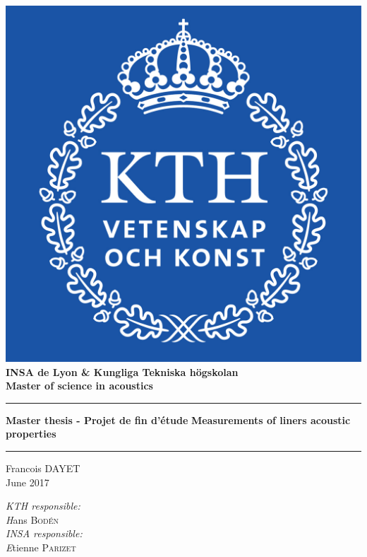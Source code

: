 \begin{titlepage}
    \begin{sffamily}
    \begin{center}
    \includegraphics[scale=0.7]{logokth.png}\\
    	\vspace{1cm}
    \LARGE{\textbf{INSA de Lyon \& Kungliga Tekniska högskolan}}\\
    \LARGE{\textbf{Master of science in acoustics}}
    	\vspace{1cm}
	\noindent\rule{15cm}{1pt}
		\vspace{1em}
		\Huge{\textbf{Master thesis - Projet de fin d'étude}}
		\vspace{1em}
		\Huge{\textbf{Measurements of liners acoustic properties}}	
	\noindent\rule{15cm}{1pt}
	\vspace{2cm}
    \end{center}        
    \begin{minipage}{0.5\textwidth}
      \begin{flushleft} \LARGE
        Francois \textsc{DAYET}\\
        June 2017
      \end{flushleft}
    \end{minipage}
    \begin{minipage}{0.45\textwidth}
      \begin{flushright} \large
        \emph{KTH responsible:}\\  
        \emph Hans \textsc{Bodén} \\  
        \emph{INSA responsible:} \\
        \emph Etienne \textsc{Parizet}
      \end{flushright}
    \end{minipage}
    \end{sffamily}
\end{titlepage}